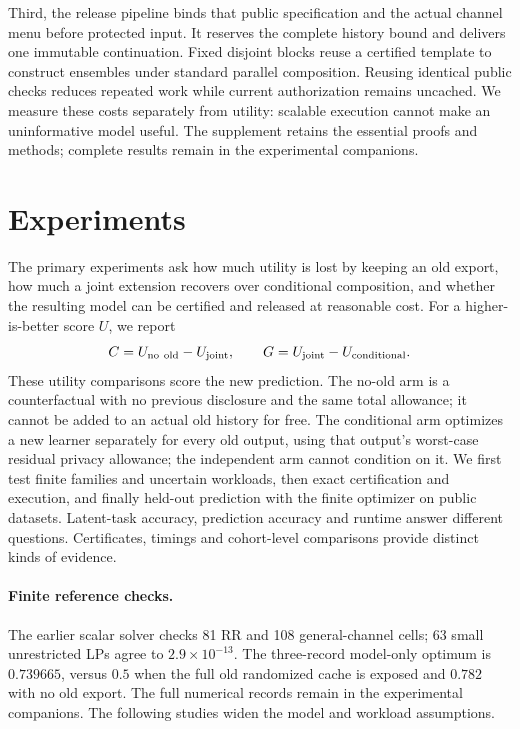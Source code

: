 \documentclass{article}
\begin{document}
Third, the release pipeline binds that public specification and the actual
channel menu before protected input. It reserves the complete history
bound and delivers one immutable continuation. Fixed disjoint blocks
reuse a certified template to construct ensembles under standard parallel
composition. Reusing identical public checks reduces repeated work while
current authorization remains uncached. We measure these costs separately
from utility: scalable execution cannot make an uninformative model useful.
The supplement retains the essential proofs and methods; complete results
remain in the experimental companions.




\section{Experiments}
\label{sec:experiments}
The primary experiments ask how much utility is lost by keeping an old
export, how much a joint extension recovers over conditional composition,
and whether the resulting model can be certified and released at reasonable
cost. For a higher-is-better score $U$, we report
\[
 C=U_{\rm no\ old}-U_{\rm joint},\qquad
 G=U_{\rm joint}-U_{\rm conditional}.
\]
These utility comparisons score the new prediction. The no-old arm is
a counterfactual with no previous disclosure and the
same total allowance; it cannot be added to an actual old history for
free. The conditional arm optimizes a new learner separately for every
old output, using that output's worst-case residual privacy allowance;
the independent arm cannot condition on it. We first test finite
families and uncertain workloads, then exact certification and execution,
and finally held-out prediction with the finite optimizer on public
datasets. Latent-task accuracy, prediction accuracy and runtime answer
different questions. Certificates, timings and cohort-level comparisons
provide distinct kinds of evidence.

\paragraph{Finite reference checks.}
The earlier scalar solver checks 81 RR and 108 general-channel cells;
63 small unrestricted LPs agree to $2.9\times10^{-13}$.
The three-record model-only optimum is $0.739665$, versus $0.5$
when the full old randomized cache is exposed and $0.782$ with no
old export. The full numerical records remain in the experimental companions.
The following studies widen the model and workload assumptions.





\end{document}
